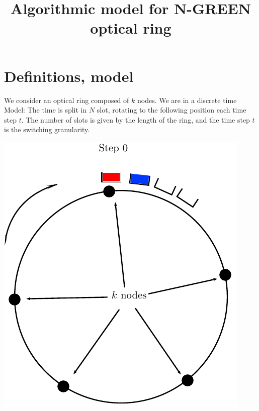 \documentclass[a4paper,10pt]{article}
\title{Algorithmic model for N-GREEN optical ring}
\begin{document}
\maketitle

\section*{Definitions, model}
We consider an optical ring composed of $k$ nodes.
We are in a discrete time Model: The time is split in $N$ slot, rotating to the following position each time step $t$. The number of slots is given by the length of the ring, and the time step $t$ is the switching granularity. 
\begin{center}   

      \includegraphics[scale=0.5]{anneau1.pdf}
      \hspace{3cm}

\end{center}
\end{document}
